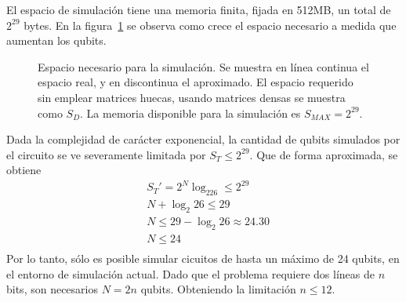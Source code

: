El espacio de simulación tiene una memoria finita, fijada en 512MB, un total de 
$2^{29}$ bytes. En la figura~\ref{fig:espacio-qc} se observa como crece el 
espacio necesario a medida que aumentan los qubits.
%
\begin{figure}[!htb]
\centering
{}
\caption{Espacio necesario para la simulación. Se muestra en línea continua el 
espacio real, y en discontinua el aproximado. El espacio requerido sin emplear 
matrices huecas, usando matrices densas se muestra como $S_D$. La memoria 
disponible para la simulación es $S_{MAX} = 2^{29}$.}
\label{fig:espacio-qc}
\end{figure}
%
Dada la complejidad de carácter exponencial, la cantidad de qubits simulados por 
el circuito se ve severamente limitada por $S_T \leq 2^{29}$. Que de forma 
aproximada, se obtiene
\begin{equation*}
\begin{split}
&S_T' = 2^N \log_226 \leq 2^{29} \\
&N + \log_2 26 \leq 29 \\
&N \leq 29 - \log_2 26 \approx 24.30 \\
&N \leq 24 \\
\end{split}
\end{equation*}
Por lo tanto, sólo es posible simular cicuitos de hasta un máximo de 24 qubits, 
en el entorno de simulación actual. Dado que el problema requiere dos líneas de 
$n$ bits, son necesarios $N = 2n$ qubits. Obteniendo la limitación $n \leq 12$.


